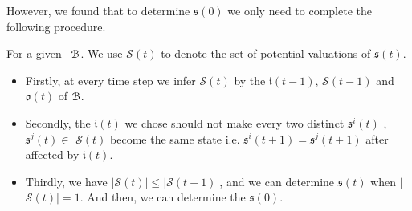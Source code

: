 However, we found that to determine $\mathfrak{s}(0)$ we only need to complete the following procedure.

For a given \BCN\  ${\mathcal{B}}$.  We use $\mathcal{S}(t)$ to denote the set of potential valuations of $\mathfrak{s}(t)$. 
\begin{itemize}
	\item  Firstly, at every time step we infer $\mathcal{S}(t)$ by the $\mathfrak{i}(t-1)$, $\mathcal{S}(t-1)$ and $\mathfrak{o}(t)$ of ${\mathcal{B}}$.
	\item Secondly, the $\mathfrak{i}(t)$ we chose should not make every two distinct $\mathfrak{s}^{i}(t)$ , $\mathfrak{s}^{j}(t)$$\in$ $\mathcal{S}(t)$ become the same state i.e. $\mathfrak{s}^{i}(t+1)=$$\mathfrak{s}^{j}(t+1)$ after affected by $\mathfrak{i}(t)$.  
	\item Thirdly, we have $|$$\mathcal{S}(t)$$|\le|$$\mathcal{S}(t-1)$$|$, and we can determine $\mathfrak{s}(t)$ when $|$$\mathcal{S}(t)$$|=1$. And then, we can determine the $\mathfrak{s}(0)$.
\end{itemize}

